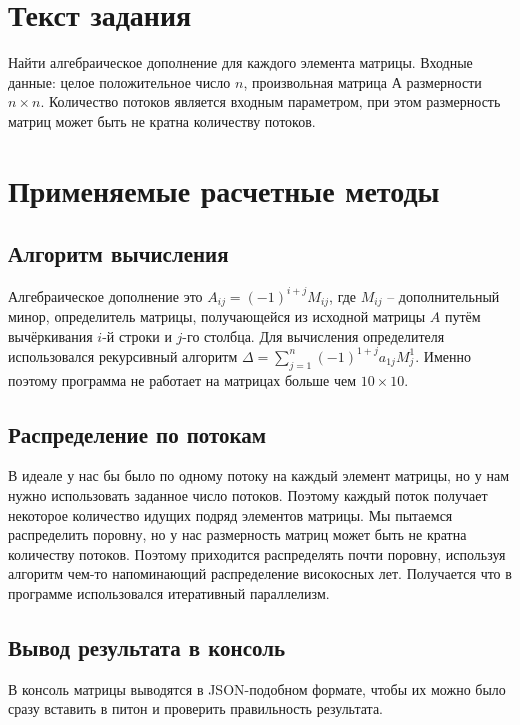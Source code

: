 \documentclass[a4paper]{article}
\begin{document}
  \newpage
  \tableofcontents
  \newpage

  \section{Текст задания}
  Найти алгебраическое дополнение для каждого элемента матрицы.
  Входные данные: целое положительное число $n$, произвольная матрица А размерности $n \times n$.
  Количество потоков является входным параметром, при этом размерность
  матриц может быть не кратна количеству потоков. \cite{task}

  \newpage
  \section{Применяемые расчетные методы}
  \subsection{Алгоритм вычисления}
  Алгебраическое дополнение это $A_{ij} = (-1)^{i+j}M_{ij}$, где $M_{ij}$ -- дополнительный минор, определитель матрицы,
  получающейся из исходной матрицы $A$ путём вычёркивания $i$-й строки и $j$-го столбца. \cite{math}
  Для вычисления определителя использовался рекурсивный алгоритм $\Delta=\sum_{j=1}^n (-1)^{1+j} a_{1j} M_j^1$. \cite{det}
  Именно поэтому программа не работает на матрицах больше чем $10 \times 10$.

  \subsection{Распределение по потокам}
  В идеале у нас бы было по одному потоку на каждый элемент матрицы, но у нам нужно использовать заданное число потоков.
  Поэтому каждый поток получает некоторое количество идущих подряд элементов матрицы.
  Мы пытаемся распределить поровну, но у нас размерность матриц может быть не кратна количеству потоков.
  Поэтому приходится распределять почти поровну, используя алгоритм чем-то напоминающий распределение високосных лет.
  Получается что в программе использовался итеративный параллелизм.

  \subsection{Вывод результата в консоль}
  В консоль матрицы выводятся в JSON-подобном формате, чтобы их можно было сразу вставить в питон и проверить правильность результата.
\end{document}
